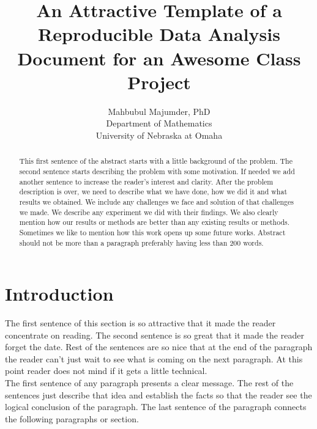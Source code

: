 \documentclass{article}\usepackage[]{graphicx}\usepackage[]{color}
\begin{document}



\title {An Attractive Template of a Reproducible Data Analysis Document for an Awesome Class Project}
\author{Mahbubul Majumder, PhD\\ Department of Mathematics\\ University of Nebraska at Omaha }

\maketitle



\begin{abstract}This first sentence of the abstract starts with a little background of the problem. The second sentence starts describing the problem with some motivation. If needed we add another sentence to increase the reader's interest and clarity. After the problem description is over, we need to describe what we have done, how we did it and what results we obtained. We include any challenges we face and solution of that challenges we made. We describe any experiment we did with their findings. We also clearly mention how our results or methods are better than any existing results or methods. Sometimes we like to mention how this work opens up some future works. Abstract should not be more than a paragraph preferably having less than 200 words.
\end{abstract}


\section{Introduction} The first sentence of this section is so attractive that it made the reader concentrate on reading. The second sentence is so great that it made the reader forget the date. Rest of the sentences are so nice that at the end of the paragraph the reader can't just wait to see what is coming on the next paragraph. At this point reader does not mind if it gets a little technical.  \\

The first sentence of any paragraph presents a clear message. The rest of the sentences just describe that idea and establish the facts so that the reader see the logical conclusion of the paragraph. The last sentence of the paragraph connects the following paragraphs or section.  \\
\end{document}
